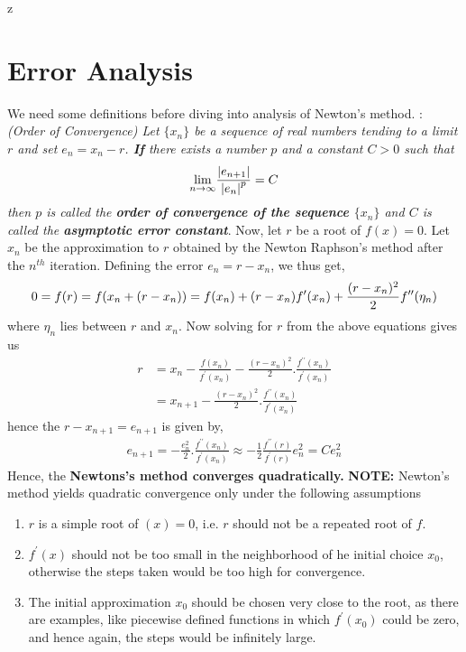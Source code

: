 z\documentclass[a4paper,12pt,twoside]{book}
\newcommand{\nll}[0]{\newline\newline}
\newcommand{\tit}[1]{\textit{#1}}
\newcommand{\defin}[0]{\boxed{\textbf{\textit{Definition}}}}
\DeclarePairedDelimiter\abs{\lvert}{\rvert}
\begin{document}
\section{Error Analysis}
We need some definitions before diving into analysis of Newton's method.
\nll
\defin  : \tit{(Order of Convergence) Let $\{x_n\}$ be a sequence of real numbers tending to a limit $r$ and set $e_n = x_n - r$. \textbf{If} there exists a number $p$ and a constant $C>0$ such that
\[ \underset{n\to \infty}{\lim} \frac{\abs*{e_{n+1}}}{\abs*{e_n}^p} = C\]
then $p$ is called the \textbf{order of convergence of the sequence $\{x_n\}$} and $C$ is called the \textbf{asymptotic error constant}}.  
\nll
Now, let $r$ be a root of $f(x) = 0$. Let $x_n$ be the approximation to $r$ obtained by the Newton Raphson's method after the $n^{th}$ iteration. Defining the error $e_n = r - x_n$, we thus get,
\[0 = f(r) = f(x_n +(r-x_n))\\
= f(x_n) + (r-x_n)f^\prime(x_n) + \frac{(r-x_n)^2}{2}f^{\prime\prime} (\eta_n)
\]
where $\eta_n$ lies between $r$ and $x_n$. Now solving for $r$ from the above equations gives us
\begin{equation*}
    \begin{split}
        r &= x_n -  \frac{f(x_n)}{f^\prime(x_n)} - \frac{(r - x_n)^2}{2} . \frac{f^{\prime\prime}(x_n)}{f^\prime(x_n)}\\
        &= x_{n+1} - \frac{(r - x_n)^2}{2} . \frac{f^{\prime\prime}(x_n)}{f^\prime(x_n)}
    \end{split}
\end{equation*}
hence the $r-x_{n+1} = e_{n+1}$ is given by,
\begin{equation*}
    \begin{split}
        e_{n+1} = -\frac{e_n^2}{2} . \frac{f^{\prime\prime}(x_n)}{f^\prime(x_n)} \approx -\frac{1}{2} \frac{f^{\prime\prime}(r)}{f^\prime(r)} e^2_n =Ce_n^2
    \end{split}
\end{equation*}
Hence, the \textbf{Newtons's method converges quadratically.}
\nll
\textbf{NOTE: } Newton's method yields quadratic convergence only under the following assumptions
\begin{enumerate}
    \item {$r$ is a simple root of $(x) = 0$, i.e. $r$ should not be a repeated root of $f$.}
    \item{$f^\prime(x) $ should not be too small in the neighborhood of he initial choice $x_0$, otherwise the steps taken would be too high for convergence.}
    \item{The initial approximation $x_0$ should be chosen very close to the root, as there are examples, like piecewise defined functions in which $f^\prime(x_0)$ could be zero, and hence again, the steps would be infinitely large.}
\end{enumerate}
\end{document}
